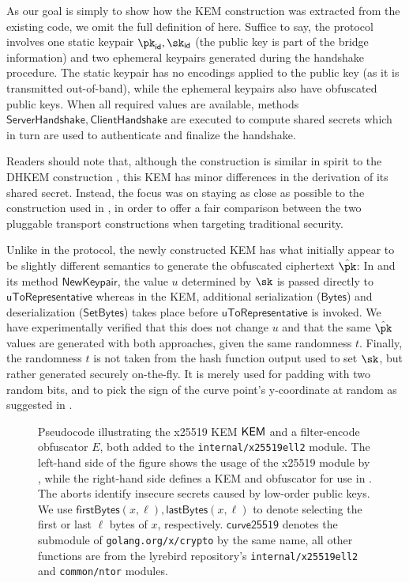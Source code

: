 As our goal is simply to show how the KEM construction was extracted from the existing code, we omit the full definition of \obfsfour{} here. Suffice to say, the protocol involves one static keypair $\pk_\mathsf{id}, \sk_\mathsf{id}$ (the public key is part of the bridge information) and two ephemeral keypairs generated during the handshake procedure. The static keypair has no encodings applied to the public key (as it is transmitted out-of-band), while the ephemeral keypairs also have obfuscated public keys. When all required values are available, methods $\mathsf{ServerHandshake}, \mathsf{ClientHandshake}$ are executed to compute shared secrets which in turn are used to authenticate and finalize the handshake.

Readers should note that, although the construction is similar in spirit to the DHKEM construction \cite[Section~4.1]{rfc9180}, this KEM has minor differences in the derivation of its shared secret. Instead, the focus was on staying as close as possible to the construction used in \obfsfour{}, in order to offer a fair comparison between the two pluggable transport constructions when targeting traditional security.

Unlike in the \obfsfour{} protocol, the newly constructed KEM has what initially appear to be slightly different semantics to generate the obfuscated ciphertext $\hat \pk$:
In \obfsfour{} and its method $\mathsf{NewKeypair}$, the value $u$ determined by $\sk$ is passed directly to $\mathsf{uToRepresentative}$ whereas in the KEM, additional serialization ($\mathsf{Bytes}$) and deserialization ($\mathsf{SetBytes}$) takes place before $\mathsf{uToRepresentative}$ is invoked.
We have experimentally verified that this does not change $u$ and that the same $\hat \pk$ values are generated with both approaches, given the same randomness $t$.
Finally, the randomness $t$ is not taken from the hash function output used to set $\sk$, but rather generated securely on-the-fly. It is merely used for padding with two random bits, and to pick the sign of the curve point's y-coordinate at random as suggested in \cite{elligatorExplicitFormulas}.

\begin{figure}
    
    \caption[
        Pseudocode illustrating the x25519 KEM and filter-encode obfuscator added to the \texttt{internal/x25519ell2} module.
    ]{
        Pseudocode illustrating the x25519 KEM $\mathsf{KEM}$ and a filter-encode obfuscator $E$, both added to the \texttt{internal/x25519ell2} module.
        The left-hand side of the figure shows the usage of the x25519 module by \obfsfour{}, while the right-hand side defines a KEM and obfuscator for use in \drivel{}.
        The aborts identify insecure secrets caused by low-order public keys.
        We use $\mathsf{firstBytes}(x, \ell), \mathsf{lastBytes}(x, \ell)$ to denote selecting the first or last $\ell$ bytes of $x$, respectively.
        $\mathsf{curve25519}$ denotes the submodule of \texttt{golang.org/x/crypto} by the same name, all other functions are from the lyrebird repository's \texttt{internal/x25519ell2} and \texttt{common/ntor} modules.
    }
    \label{fig:impl-x25519-kem}
\end{figure}

